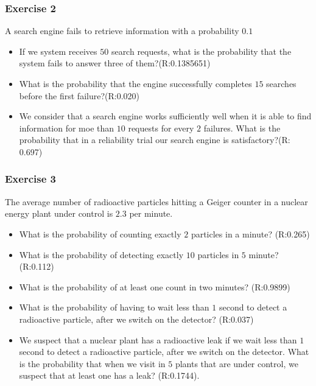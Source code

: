 \documentclass[
]{book}
\begin{document}
\hypertarget{exercise-2-4}{%
\subsubsection{Exercise 2}\label{exercise-2-4}}

A search engine fails to retrieve information with a probability \(0.1\)

\begin{itemize}
\item
  If we system receives \(50\) search requests, what is the probability that the system fails to answer three of them?(R:0.1385651)
\item
  What is the probability that the engine successfully completes \(15\) searches before the first failure?(R:0.020)
\item
  We consider that a search engine works sufficiently well when it is able to find information for moe than \(10\) requests for every \(2\) failures. What is the probability that in a reliability trial our search engine is satisfactory?(R: 0.697)
\end{itemize}

\hypertarget{exercise-3-2}{%
\subsubsection{Exercise 3}\label{exercise-3-2}}

The average number of radioactive particles hitting a Geiger counter in a nuclear energy plant under control is \(2.3\) per minute.

\begin{itemize}
\item
  What is the probability of counting exactly \(2\) particles in a minute? (R:0.265)
\item
  What is the probability of detecting exactly \(10\) particles in \(5\) minute? (R:0.112)
\item
  What is the probability of at least one count in two minutes? (R:0.9899)
\item
  What is the probability of having to wait less than \(1\) second to detect a radioactive particle, after we switch on the detector? (R:0.037)
\item
  We suspect that a nuclear plant has a radioactive leak if we wait less than \(1\) second to detect a radioactive particle, after we switch on the detector. What is the probability that when we visit in \(5\) plants that are under control, we suspect that at least one has a leak? (R:0.1744).
\end{itemize}
\end{document}
